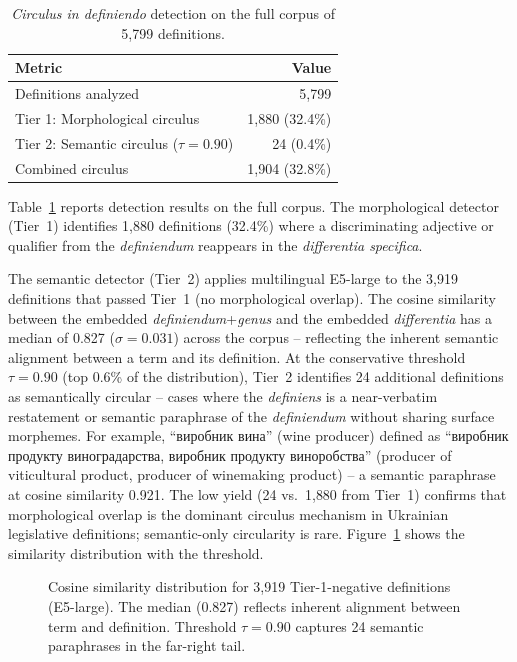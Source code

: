 \documentclass[11pt]{article}
\begin{document}
\begin{table}[t]
\centering
\caption{\emph{Circulus in definiendo} detection on the full corpus of 5{,}799 definitions.}
\label{tab:circulus}
\begin{tabular}{lr}
\toprule
\textbf{Metric} & \textbf{Value} \\
\midrule
Definitions analyzed & 5{,}799 \\
Tier 1: Morphological circulus & 1{,}880 (32.4\%) \\
Tier 2: Semantic circulus ($\tau = 0.90$) & 24 (0.4\%) \\
\midrule
Combined circulus & 1{,}904 (32.8\%) \\
\bottomrule
\end{tabular}
\end{table}

Table~\ref{tab:circulus} reports detection results on the full corpus.
The morphological detector (Tier~1) identifies 1{,}880 definitions (32.4\%) where a discriminating adjective or qualifier from the \emph{definiendum} reappears in the \emph{differentia specifica}.

The semantic detector (Tier~2) applies multilingual E5-large to the 3{,}919 definitions that passed Tier~1 (no morphological overlap).
The cosine similarity between the embedded \emph{definiendum}+\emph{genus} and the embedded \emph{differentia} has a median of 0.827 ($\sigma = 0.031$) across the corpus -- reflecting the inherent semantic alignment between a term and its definition.
At the conservative threshold $\tau = 0.90$ (top 0.6\% of the distribution), Tier~2 identifies 24 additional definitions as semantically circular -- cases where the \emph{definiens} is a near-verbatim restatement or semantic paraphrase of the \emph{definiendum} without sharing surface morphemes.
For example, \foreignlanguage{ukrainian}{``виробник вина''} (wine producer) defined as \foreignlanguage{ukrainian}{``виробник продукту виноградарства, виробник продукту виноробства''} (producer of viticultural product, producer of winemaking product) -- a semantic paraphrase at cosine similarity 0.921.
The low yield (24 vs.\ 1{,}880 from Tier~1) confirms that morphological overlap is the dominant circulus mechanism in Ukrainian legislative definitions; semantic-only circularity is rare.
Figure~\ref{fig:semantic-dist} shows the similarity distribution with the threshold.

\begin{figure}[t]
\centering

\caption{Cosine similarity distribution for 3{,}919 Tier-1-negative definitions (E5-large). The median (0.827) reflects inherent alignment between term and definition. Threshold $\tau=0.90$ captures 24 semantic paraphrases in the far-right tail.}
\label{fig:semantic-dist}
\end{figure}
\end{document}
